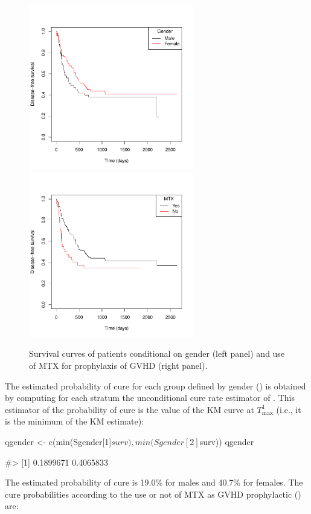 \begin{figure}[htbp]
\centering
  \includegraphics[width=7.2cm, height=7.2cm]{Figure-046}\includegraphics[width=7.2cm, height=7.2cm]{Figure-047}
  \caption{Survival curves of patients conditional on gender (left panel) and use of MTX for prophylaxis of GVHD (right panel).}
  \label{fig:KMcond} 
\end{figure}

The estimated probability of cure for each group defined by gender () is obtained by computing for each stratum the unconditional cure rate estimator of \cite{Laska}. This estimator of the probability of cure is the value of the KM curve at $T^1_{\max}$ (i.e., it is the minimum of the KM estimate):

\begin{example}
qgender <- c(min(Sgender[1]$surv), min(Sgender[2]$surv))
qgender
\end{example}
\begin{example}
#> [1] 0.1899671 0.4065833
\end{example}


The estimated probability of cure is 19.0\% for males and 40.7\% for females. The cure probabilities according to the use or not of MTX as GVHD prophylactic () are:

